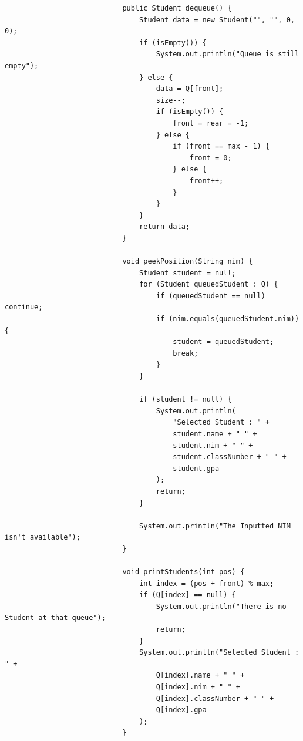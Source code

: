 \documentclass[12pt,titlepage]{article}
\begin{document}
\begin{enumerate}
{\begin{itemize}
\begin{itemize}
{\begin{verbatim}
                            public Student dequeue() {
                                Student data = new Student("", "", 0, 0);
                                if (isEmpty()) {
                                    System.out.println("Queue is still empty");
                                } else {
                                    data = Q[front];
                                    size--;
                                    if (isEmpty()) {
                                        front = rear = -1;
                                    } else {
                                        if (front == max - 1) {
                                            front = 0;
                                        } else {
                                            front++;
                                        }
                                    }
                                }
                                return data;
                            }

                            void peekPosition(String nim) {
                                Student student = null;
                                for (Student queuedStudent : Q) {
                                    if (queuedStudent == null) continue;
                                    if (nim.equals(queuedStudent.nim)) {
                                        student = queuedStudent;
                                        break;
                                    }
                                }

                                if (student != null) {
                                    System.out.println(
                                        "Selected Student : " +
                                        student.name + " " +
                                        student.nim + " " +
                                        student.classNumber + " " +
                                        student.gpa
                                    );
                                    return;
                                }

                                System.out.println("The Inputted NIM isn't available");
                            }

                            void printStudents(int pos) {
                                int index = (pos + front) % max;
                                if (Q[index] == null) {
                                    System.out.println("There is no Student at that queue");
                                    return;
                                }
                                System.out.println("Selected Student : " +
                                    Q[index].name + " " +
                                    Q[index].nim + " " +
                                    Q[index].classNumber + " " +
                                    Q[index].gpa
                                );
                            }
                    \end{verbatim}
                }
            \end{itemize}
        \end{itemize}
    }
\end{enumerate}
\end{document}
